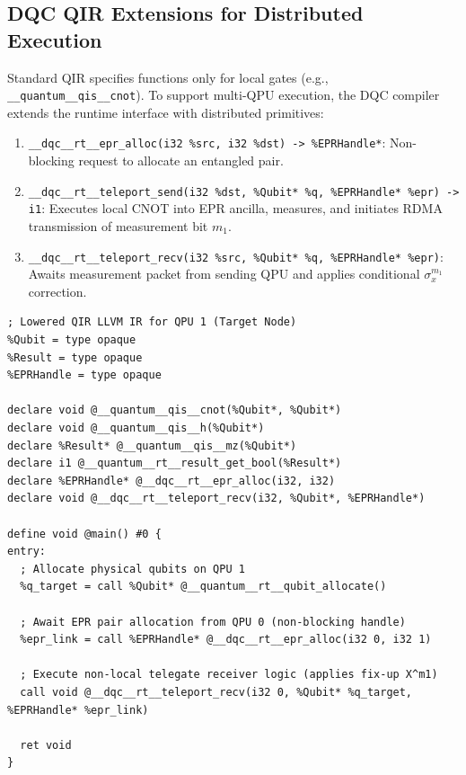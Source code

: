 \subsection{DQC QIR Extensions for Distributed Execution}
Standard QIR specifies functions only for local gates (e.g., \texttt{\_\_quantum\_\_qis\_\_cnot}). To support multi-QPU execution, the DQC compiler extends the runtime interface with distributed primitives:
\begin{enumerate}
    \item \texttt{\_\_dqc\_\_rt\_\_epr\_alloc(i32 \%src, i32 \%dst) -> \%EPRHandle*}: Non-blocking request to allocate an entangled pair.
    \item \texttt{\_\_dqc\_\_rt\_\_teleport\_send(i32 \%dst, \%Qubit* \%q, \%EPRHandle* \%epr) -> i1}: Executes local CNOT into EPR ancilla, measures, and initiates RDMA transmission of measurement bit $m_1$.
    \item \texttt{\_\_dqc\_\_rt\_\_teleport\_recv(i32 \%src, \%Qubit* \%q, \%EPRHandle* \%epr)}: Awaits measurement packet from sending QPU and applies conditional $\sigma_x^{m_1}$ correction.
\end{enumerate}

\begin{lstlisting}[language=MLIR, caption={Lowered QIR LLVM Assembly for Distributed CNOT Receiver}]
; Lowered QIR LLVM IR for QPU 1 (Target Node)
%Qubit = type opaque
%Result = type opaque
%EPRHandle = type opaque

declare void @__quantum__qis__cnot(%Qubit*, %Qubit*)
declare void @__quantum__qis__h(%Qubit*)
declare %Result* @__quantum__qis__mz(%Qubit*)
declare i1 @__quantum__rt__result_get_bool(%Result*)
declare %EPRHandle* @__dqc__rt__epr_alloc(i32, i32)
declare void @__dqc__rt__teleport_recv(i32, %Qubit*, %EPRHandle*)

define void @main() #0 {
entry:
  ; Allocate physical qubits on QPU 1
  %q_target = call %Qubit* @__quantum__rt__qubit_allocate()
  
  ; Await EPR pair allocation from QPU 0 (non-blocking handle)
  %epr_link = call %EPRHandle* @__dqc__rt__epr_alloc(i32 0, i32 1)
  
  ; Execute non-local telegate receiver logic (applies fix-up X^m1)
  call void @__dqc__rt__teleport_recv(i32 0, %Qubit* %q_target, %EPRHandle* %epr_link)
  
  ret void
}
\end{lstlisting}

